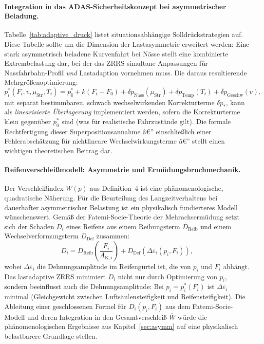 ﻿\documentclass[a4paper,12pt]{article}
\theoremstyle{definition}
\begin{document}
\paragraph{Integration in das ADAS-Sicherheitskonzept bei asymmetrischer Beladung.}
Tabelle~\ref{tab:adaptive_druck} listet situationsabhängige Solldrückstrategien
auf. Diese Tabelle sollte um die Dimension der Lastasymmetrie erweitert werden:
Eine stark asymmetrisch beladene Kurvenfahrt bei Nässe stellt eine
kombinierte Extrembelastung dar, bei der das ZRRS simultane Anpassungen
für Nassfahrbahn-Profil \emph{und} Lastadaption vornehmen muss. Die daraus
resultierende Mehrgrößenoptimierung:
\[
    p^*_i(F_i, v, \mu_{\text{Str}}, T_i)
    = p^*_0 + k(F_i - F_0)
    + \delta p_{\text{Nass}}(\mu_{\text{Str}})
    + \delta p_{\text{Temp}}(T_i)
    + \delta p_{\text{Geschw}}(v),
\]
mit separat bestimmbaren, schwach wechselwirkenden Korrekturterme $\delta p_*$,
kann als \emph{linearisierte Überlagerung} implementiert werden, sofern die
Korrekturterme klein gegenüber $p^*_0$ sind (was für realistische
Fahrzustände gilt). Die formale Rechtfertigung dieser Superpositionsannahme
â€” einschließlich einer Fehlerabschätzung für nichtlineare Wechselwirkungs\-terme â€”
stellt einen wichtigen theoretischen Beitrag dar.

\paragraph{Reifenverschleißmodell: Asymmetrie und Ermüdungsbruchmechanik.}
Der Verschleißindex $W(p)$ aus Definition~4 ist eine phänomenologische,
quadratische Näherung. Für die Beurteilung des Langzeitverhaltens
bei dauerhafter asymmetrischer Belastung ist ein physikalisch fundierteres
Modell wünschenswert. Gemäß der Fatemi-Socie-Theorie der Mehr\-achs\-ermüdung
\cite{fatemi} setzt sich der Schaden $D_i$ eines Reifens aus einem
Reibungsterm $D_{\text{Reib}}$ und einem Wechselverformungsterm
$D_{\text{Def}}$ zusammen:
\[
    D_i = D_{\text{Reib}}\!\left(\frac{F_i}{A_{\text{K},i}}\right)
    + D_{\text{Def}}\!\left(\Delta\varepsilon_i(p_i, F_i)\right),
\]
wobei $\Delta\varepsilon_i$ die Dehnungsamplitude im Reifengürtel ist, die
von $p_i$ und $F_i$ abhängt. Das lastadaptive ZRRS minimiert $D_i$ nicht
nur durch Optimierung von $p_i$, sondern beeinflusst auch die
Dehnungsamplitude: Bei $p_i = p^*_i(F_i)$ ist $\Delta\varepsilon_i$ minimal
(Gleichgewicht zwischen Luftsäulensteifigkeit und Reifensteifigkeit).
Die Ableitung einer geschlossenen Formel für $D_i(p_i, F_i)$ aus dem
Fatemi-Socie-Modell und deren Integration in den Gesamtverschleiß
$\overline{W}$ würde die phänomenologischen Ergebnisse aus
Kapitel~\ref{sec:asymm} auf eine physikalisch belastbarere Grundlage stellen.
\end{document}
